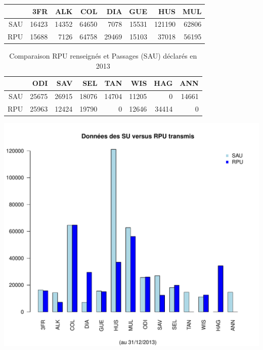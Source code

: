 \documentclass{article}\usepackage[]{graphicx}\usepackage[]{color}
\makeatletter
\def\maxwidth{ %
  \ifdim\Gin@nat@width>\linewidth
    \linewidth
  \else
    \Gin@nat@width
  \fi
}
\makeatother
\begin{document}
\begin{table}[ht]
\centering
\begin{tabular}{rrrrrrrr}
  \hline
 & 3FR & ALK & COL & DIA & GUE & HUS & MUL \\ 
  \hline
SAU & 16423 & 14352 & 64650 & 7078 & 15531 & 121190 & 62806 \\ 
  RPU & 15688 & 7126 & 64758 & 29469 & 15103 & 37018 & 56195 \\ 
   \hline
\end{tabular}
\end{table}
\begin{table}[ht]
\centering
\begin{tabular}{rrrrrrrr}
  \hline
 & ODI & SAV & SEL & TAN & WIS & HAG & ANN \\ 
  \hline
SAU & 25675 & 26915 & 18076 & 14704 & 11205 & 0 & 14661 \\ 
  RPU & 25963 & 12424 & 19790 & 0 & 12646 & 34414 & 0 \\ 
   \hline
\end{tabular}
\caption[Comparaisons RPU-Passages]{Comparaison RPU renseignés et Passages (SAU) déclarés en 2013} 
\label{fig:rpu_p}
\end{table}

\includegraphics[width=\maxwidth]{figure/sau_rpu} 
\end{document}
